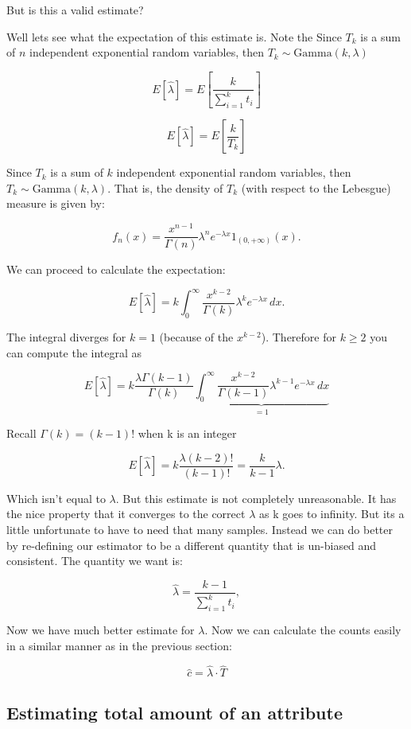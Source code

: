 \documentclass[a4paper]{article}
\begin{document}
But is this a valid estimate?

Well lets see what the expectation of this estimate is.
Note the Since $T_k$ is a sum of $n$ independent exponential random variables, then $T_k\sim\mathrm{Gamma}(k,\lambda)$

$$E[\hat{\lambda}] = E[ \frac{k}{ \sum^{k}_{i=1} t_i } ]$$

$$E[\hat{\lambda}] = E[ \frac{k}{ T_k } ]$$

Since $T_k$ is a sum of $k$ independent exponential random variables, then $T_k\sim\mathrm{Gamma}(k,\lambda)$. That is, the density of $T_k$ (with respect to the Lebesgue) measure is given by:

$$
f_n(x)=\frac{x^{n-1}}{\Gamma(n)}\lambda^ne^{-\lambda x} 1_{(0,+\infty)}(x).
$$

We can proceed to calculate the expectation:

$$
 E\left[\hat\lambda\right]=k\int_0^\infty\frac{x^{k-2}}{\Gamma(k)}\lambda^ke^{-\lambda x}\, dx.
$$

The integral diverges for $k=1$ (because of the $x^{k-2}$).
Therefore for $k\ge2$  you can compute the integral as

$$
 E\left[\hat\lambda \right]=k\frac{\lambda\Gamma(k-1)}{\Gamma(k)}\underbrace{\int_0^\infty\frac{x^{k-2}}{\Gamma(k-1)}\lambda^{k-1}e^{-\lambda x}\, dx}_{=1}
$$

Recall $\Gamma{(k)} = (k-1)!$ when k is an integer

$$
E[\hat{\lambda}] =  k\frac{\lambda (k-2)! }{(k-1)!}= \frac k{k-1}\lambda.
$$

Which isn't equal to $\lambda$. 
But this estimate is not completely unreasonable.
It has the nice property that it converges to the correct $\lambda$ as k goes to infinity.
But its a little unfortunate to have to need that many samples.
Instead we can do better by re-defining our estimator to be a different quantity that is un-biased and consistent.
The quantity we want is:

$$
\hat\lambda =\frac{k-1}{\sum_{i=1}^k t_i},
$$


Now we have much better estimate for $\lambda$.
Now we can calculate the counts easily in a similar manner as in the previous section:

$$\hat{c} = \hat{\lambda} \cdot \hat{T} $$

\subsection{Estimating total amount of an attribute}
\end{document}
